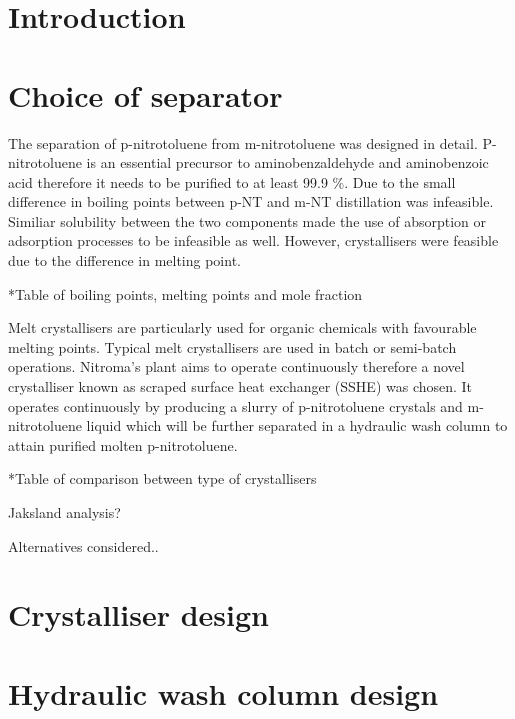 \section{Introduction}


\section{Choice of separator}
The separation of p-nitrotoluene from m-nitrotoluene was designed in detail. P-nitrotoluene is an essential precursor to aminobenzaldehyde and aminobenzoic acid therefore it needs to be purified to at least 99.9 \%. Due to the small difference in boiling points between p-NT and m-NT distillation was infeasible. Similiar solubility between the two components made the use of absorption or adsorption processes to be infeasible as well. However, crystallisers were feasible due to the difference in melting point. 

*Table of boiling points, melting points and mole fraction 

Melt crystallisers are particularly used for organic chemicals with favourable melting points. Typical melt crystallisers are used in batch or semi-batch operations. Nitroma’s plant aims to operate continuously therefore a novel crystalliser known as scraped surface heat exchanger (SSHE) was chosen. It operates continuously by producing a slurry of p-nitrotoluene crystals and m-nitrotoluene liquid which will be further separated in a hydraulic wash column to attain purified molten p-nitrotoluene. 

*Table of comparison between type of crystallisers

 
Jaksland analysis?

Alternatives considered..

\begin{comment}
were MSMPR crystallisers that operate continuously. However, these crystallisers are primarily used for solvent crystallisation. Melt crystallisation will be used at Nitroma to avoid the issue of handling solvents. 
\end{comment}


\section{Crystalliser design}




\section{Hydraulic wash column design}


